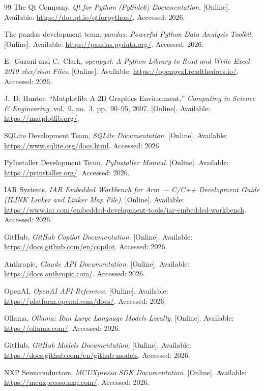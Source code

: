\documentclass[12pt,a4paper,oneside]{book}
\begin{document}
\begin{thebibliography}{99}
The Qt Company, \emph{Qt for Python (PySide6) Documentation}. [Online]. Available: \url{https://doc.qt.io/qtforpython/}. Accessed: 2026.

The pandas development team, \emph{pandas: Powerful Python Data Analysis Toolkit}. [Online]. Available: \url{https://pandas.pydata.org/}. Accessed: 2026.

E.~Gazoni and C.~Clark, \emph{openpyxl: A Python Library to Read and Write Excel 2010 xlsx/xlsm Files}. [Online]. Available: \url{https://openpyxl.readthedocs.io/}. Accessed: 2026.

J.~D. Hunter, ``Matplotlib: A 2D Graphics Environment,'' \emph{Computing in Science \& Engineering}, vol.~9, no.~3, pp.~90--95, 2007. [Online]. Available: \url{https://matplotlib.org/}.

SQLite Development Team, \emph{SQLite Documentation}. [Online]. Available: \url{https://www.sqlite.org/docs.html}. Accessed: 2026.

PyInstaller Development Team, \emph{PyInstaller Manual}. [Online]. Available: \url{https://pyinstaller.org/}. Accessed: 2026.

IAR Systems, \emph{IAR Embedded Workbench for Arm --- C/C++ Development Guide (ILINK Linker and Linker Map File)}. [Online]. Available: \url{https://www.iar.com/embedded-development-tools/iar-embedded-workbench}. Accessed: 2026.

GitHub, \emph{GitHub Copilot Documentation}. [Online]. Available: \url{https://docs.github.com/en/copilot}. Accessed: 2026.

Anthropic, \emph{Claude API Documentation}. [Online]. Available: \url{https://docs.anthropic.com/}. Accessed: 2026.

OpenAI, \emph{OpenAI API Reference}. [Online]. Available: \url{https://platform.openai.com/docs/}. Accessed: 2026.

Ollama, \emph{Ollama: Run Large Language Models Locally}. [Online]. Available: \url{https://ollama.com/}. Accessed: 2026.

GitHub, \emph{GitHub Models Documentation}. [Online]. Available: \url{https://docs.github.com/en/github-models}. Accessed: 2026.

NXP Semiconductors, \emph{MCUXpresso SDK Documentation}. [Online]. Available: \url{https://mcuxpresso.nxp.com/}. Accessed: 2026.


\end{thebibliography}
\end{document}
